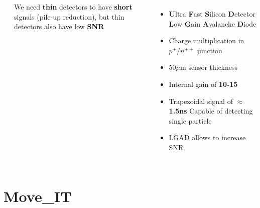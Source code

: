 \documentclass[aspectratio=169]{beamer}
\begin{document}
\begin{frame}
\begin{columns}
\begin{columns}
\begin{center}
			\end{center}
		\begin{center}
			We need \textbf{thin} detectors to have \textbf{short} signals (pile-up reduction), but thin detectors also have low \textbf{SNR}
		\end{center}
	\end{columns}
		\begin{itemize}
			\item \textbf{U}ltra \textbf{F}ast \textbf{S}ilicon \textbf{D}etector \textbf{L}ow \textbf{G}ain \textbf{A}valanche \textbf{D}iode
			\item Charge multiplication in $p^+ / n^{++}$ junction 
			\item 50$\mu$m sensor thickness
			\item Internal gain of \textbf{10-15} 
			\item Trapezoidal signal of $\approx$\textbf{1.5ns}\newline
				{\color{blue} Capable of detecting single particle }
			\item LGAD allows to increase SNR 
		\end{itemize}
	\end{columns}
	\end{frame}

	\section{Move\_IT}
	
\end{document}
